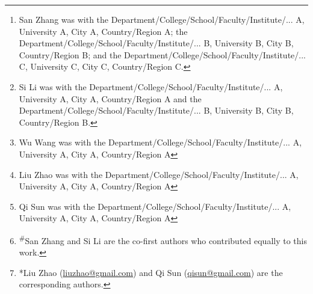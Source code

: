 \documentclass[lettersize,journal]{IEEEtran}
\begin{document}
\title{}

\author{
	San Zhang\textsuperscript{\#}\thanks{San Zhang was with the Department/College/School/Faculty/Institute/... A, University A, City A, Country/Region A; the Department/College/School/Faculty/Institute/... B, University B, City B, Country/Region B; and the Department/College/School/Faculty/Institute/... C, University C, City C, Country/Region C. }, 
	Si Li\textsuperscript{\#}\thanks{Si Li was with the Department/College/School/Faculty/Institute/... A, University A, City A, Country/Region A and the Department/College/School/Faculty/Institute/... B, University B, City B, Country/Region B. }, 
	Wu Wang\thanks{Wu Wang was with the Department/College/School/Faculty/Institute/... A, University A, City A, Country/Region A}, 
	Liu Zhao*\thanks{Liu Zhao was with the Department/College/School/Faculty/Institute/... A, University A, City A, Country/Region A}, 
	and Qi Sun*\thanks{Qi Sun was with the Department/College/School/Faculty/Institute/... A, University A, City A, Country/Region A}
	\thanks{\textsuperscript{\#}San Zhang and Si Li are the co-first authors who contributed equally to this work. }
	\thanks{*Liu Zhao (\protect\url{liuzhao@gmail.com}) and Qi Sun (\protect\url{qisun@gmail.com}) are the corresponding authors. }
}

\maketitle

\begin{abstract}
	
\end{abstract}

\begin{IEEEkeywords}
	
\end{IEEEkeywords}










\end{document}
